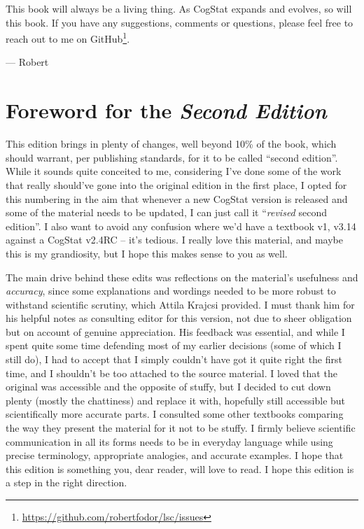 \documentclass[
  11pt,
  a4paper,
  twoside,symmetric,openright]{book}
\theoremstyle{break}
\theoremstyle{break}
\DeclareRobustCommand{\href}[2]{#2\footnote{\url{#1}}}
\begin{document}
This book will always be a living thing. As CogStat expands and evolves, so will this book. If you have any suggestions, comments or questions, please feel free to reach out to me on \href{https://github.com/robertfodor/lsc/issues}{GitHub}.

\nopagebreak[4]

--- Robert

\hypertarget{foreword-for-the-second-edition}{%
\section*{\texorpdfstring{Foreword for the \emph{Second Edition}}{Foreword for the Second Edition}}\label{foreword-for-the-second-edition}}

This edition brings in plenty of changes, well beyond 10\% of the book, which should warrant, per publishing standards, for it to be called ``second edition''. While it sounds quite conceited to me, considering I've done some of the work that really should've gone into the original edition in the first place, I opted for this numbering in the aim that whenever a new CogStat version is released and some of the material needs to be updated, I can just call it ``\emph{revised} second edition''. I also want to avoid any confusion where we'd have a textbook v1, v3.14 against a CogStat v2.4RC -- it's tedious. I really love this material, and maybe this is my grandiosity, but I hope this makes sense to you as well.

The main drive behind these edits was reflections on the material's usefulness and \emph{accuracy}, since some explanations and wordings needed to be more robust to withstand scientific scrutiny, which Attila Krajcsi provided. I must thank him for his helpful notes as consulting editor for this version, not due to sheer obligation but on account of genuine appreciation. His feedback was essential, and while I spent quite some time defending most of my earlier decisions (some of which I still do), I had to accept that I simply couldn't have got it quite right the first time, and I shouldn't be too attached to the source material. I loved that the original was accessible and the opposite of stuffy, but I decided to cut down plenty (mostly the chattiness) and replace it with, hopefully still accessible but scientifically more accurate parts. I consulted some other textbooks comparing the way they present the material for it not to be stuffy. I firmly believe scientific communication in all its forms needs to be in everyday language while using precise terminology, appropriate analogies, and accurate examples. I hope that this edition is something you, dear reader, will love to read. I hope this edition is a step in the right direction.
\end{document}
